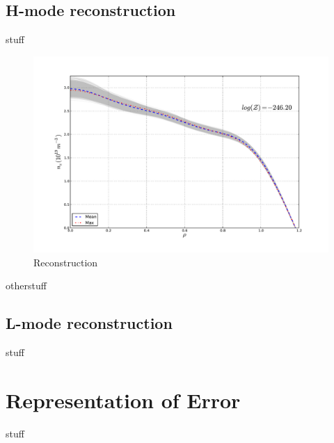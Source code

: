 \documentclass[12pt]{article}
\numberwithin{equation}{section}
\begin{document}
\subsection{H-mode reconstruction}
stuff
\begin{figure}[ht]
	\centering
	\includegraphics[width=12cm,keepaspectratio=true]{figures/bfit146102_00505_all5}
	\vspace{-30pt}
	\caption{Reconstruction}
\end{figure}
otherstuff
\subsection{L-mode reconstruction}
stuff
\section{Representation of Error}
stuff
\end{document}
